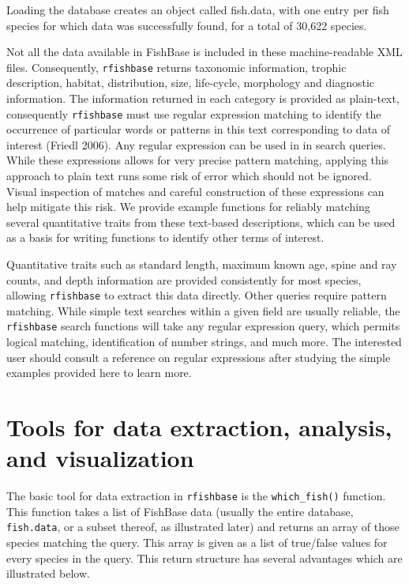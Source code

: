 \begin{Shaded}
\begin{Highlighting}[]
\NormalTok{(}\NormalTok{)}
\NormalTok{(}\NormalTok{)}
\end{Highlighting}
\end{Shaded}
Loading the database creates an object called fish.data, with one entry
per fish species for which data was successfully found, for a total of
30,622 species.

Not all the data available in FishBase is included in these
machine-readable XML files. Consequently, \texttt{rfishbase} returns
taxonomic information, trophic description, habitat, distribution, size,
life-cycle, morphology and diagnostic information. The information
returned in each category is provided as plain-text, consequently
\texttt{rfishbase} must use regular expression matching to identify the
occurrence of particular words or patterns in this text corresponding to
data of interest (Friedl 2006). Any regular expression can be used in in
search queries. While these expressions allows for very precise pattern
matching, applying this approach to plain text runs some risk of error
which should not be ignored. Visual inspection of matches and careful
construction of these expressions can help mitigate this risk. We
provide example functions for reliably matching several quantitative
traits from these text-based descriptions, which can be used as a basis
for writing functions to identify other terms of interest.

Quantitative traits such as standard length, maximum known age, spine
and ray counts, and depth information are provided consistently for most
species, allowing \texttt{rfishbase} to extract this data directly.
Other queries require pattern matching. While simple text searches
within a given field are usually reliable, the \texttt{rfishbase} search
functions will take any regular expression query, which permits logical
matching, identification of number strings, and much more. The
interested user should consult a reference on regular expressions after
studying the simple examples provided here to learn more.

\section{Tools for data extraction, analysis, and visualization}

The basic tool for data extraction in \texttt{rfishbase} is the
\texttt{which\_fish()} function. This function takes a list of FishBase
data (usually the entire database, \texttt{fish.data}, or a subset
thereof, as illustrated later) and returns an array of those species
matching the query. This array is given as a list of true/false values
for every species in the query. This return structure has several
advantages which are illustrated below.

